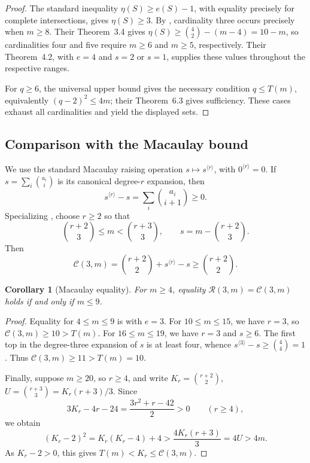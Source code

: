 \documentclass[11pt]{article}
\newtheorem{corollary}[theorem]{Corollary}
\theoremstyle{definition}
\theoremstyle{remark}
\theoremstyle{plain}
\begin{document}
\begin{proof}
The standard inequality \(\eta(S)\ge e(S)-1\), with equality precisely
for complete intersections, gives \(\eta(S)\ge3\). By
\cite[Propositions~6.2 and~7.6]{EHOOPK24}, cardinality three occurs
precisely when \(m\ge8\). Their Theorem~3.4 gives
\(\eta(S)\ge\binom42-(m-4)=10-m\), so cardinalities four and five
require \(m\ge6\) and \(m\ge5\), respectively. Their Theorem~4.2,
with \(e=4\) and \(s=2\) or \(s=1\), supplies these values throughout
the respective ranges.

For \(q\ge6\), the universal upper bound gives the necessary condition
\(q\le T(m)\), equivalently \((q-2)^2\le4m\); their Theorem~6.3
gives sufficiency. These cases exhaust all cardinalities and yield the
displayed sets.
\end{proof}

\subsection{Comparison with the Macaulay bound}\label{sec:macaulay}

We use the standard Macaulay raising operation \(s\mapsto s^{\langle r\rangle}\),
with \(0^{\langle r\rangle}=0\). If
\(s=\sum_i\binom{a_i}{i}\) is its canonical degree-\(r\) expansion, then
\[
s^{\langle r\rangle}-s=\sum_i\binom{a_i}{i+1}\ge0.
\]
Specializing \cite[equation~(1)]{MS25}, choose \(r\ge2\) so that
\[
\binom{r+2}{3}\le m<\binom{r+3}{3},
\qquad s=m-\binom{r+2}{3}.
\]
Then
\[
\mathcal C(3,m)=\binom{r+2}{2}+s^{\langle r\rangle}-s
\ge\binom{r+2}{2}.
\]

\medskip
\begin{corollary}[Macaulay equality]\label{cor:macaulay}
For \(m\ge4\), equality \(\mathcal R(3,m)=\mathcal C(3,m)\) holds
if and only if \(m\le9\).\end{corollary}

\begin{proof}
Equality for \(4\le m\le9\) is \cite[Theorem~3.3]{MS25} with
\(e=3\). For \(10\le m\le15\), we have \(r=3\), so
\(\mathcal C(3,m)\ge10>T(m)\). For \(16\le m\le19\), we have
\(r=3\) and \(s\ge6\). The first top in the degree-three expansion
of \(s\) is at least four, whence
\(s^{\langle3\rangle}-s\ge\binom44=1\). Thus
\(\mathcal C(3,m)\ge11>T(m)=10\).

Finally, suppose \(m\ge20\), so \(r\ge4\), and write
\(K_r=\binom{r+2}{2}\), \(U=\binom{r+3}{3}=K_r(r+3)/3\).
Since
\[
3K_r-4r-24=\frac{3r^2+r-42}{2}>0 \qquad(r\ge4),
\]
we obtain
\[
(K_r-2)^2=K_r(K_r-4)+4>
\frac{4K_r(r+3)}3=4U>4m.
\]
As \(K_r-2>0\), this gives \(T(m)<K_r\le\mathcal C(3,m)\).
\end{proof}
\end{document}
